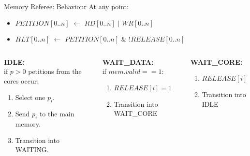 \begin{frame}{Memory Referee: Behaviour}
  At any point:
  \begin{itemize}
      \item $PETITION[0..n]$ $\longleftarrow$ $RD[0..n]$ \hspace{0.2cm}$\mid$\hspace{0.2cm} $WR[0..n]$
      
      
      \item $HLT[0..n]$ $\longleftarrow$  $PETITION[0..n]$ \hspace{0.2cm}\&\hspace{0.2cm} $!RELEASE[0..n]$
  \end{itemize}
  
  \begin{columns}[T]
    \begin{column}{0.33\textwidth}
      \textbf{IDLE:}\\
      if $p>0$ petitions from the cores occur:
      \begin{enumerate}
          \item Select one $p_i$.
          \item Send $p_i$ to the main memory.
          \item Transition into WAITING.
      \end{enumerate}
    \end{column}
    \begin{column}{0.33\textwidth}
      \textbf{WAIT\_DATA:}\\
      if $mem.valid==1$:
      \begin{enumerate}
          \item $RELEASE[i]=1$
          \item Transition into WAIT\_CORE
      \end{enumerate}
    \end{column}
    \begin{column}{0.33\textwidth}
      \textbf{WAIT\_CORE:}\\
      \begin{enumerate}
          \item $RELEASE[i]=0$
          \item Transition into IDLE
      \end{enumerate}
    \end{column}
  \end{columns}
\end{frame}

